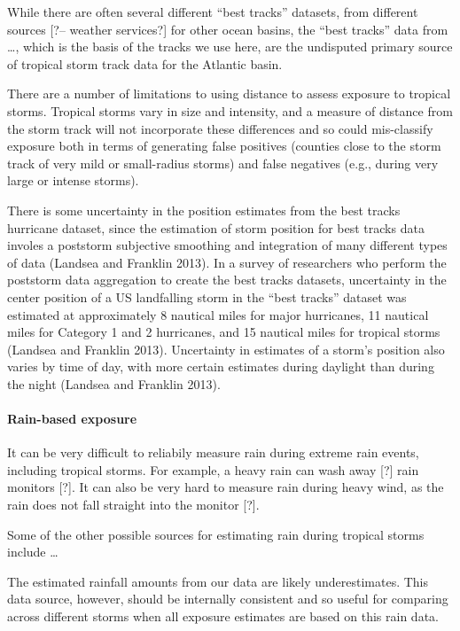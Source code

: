\documentclass[]{elsarticle} %
\begin{document}
While there are often several different ``best tracks'' datasets, from
different sources {[}?-- weather services?{]} for other ocean basins,
the ``best tracks'' data from \ldots{}, which is the basis of the tracks
we use here, are the undisputed primary source of tropical storm track
data for the Atlantic basin.

There are a number of limitations to using distance to assess exposure
to tropical storms. Tropical storms vary in size and intensity, and a
measure of distance from the storm track will not incorporate these
differences and so could mis-classify exposure both in terms of
generating false positives (counties close to the storm track of very
mild or small-radius storms) and false negatives (e.g., during very
large or intense storms).

There is some uncertainty in the position estimates from the best tracks
hurricane dataset, since the estimation of storm position for best
tracks data involes a poststorm subjective smoothing and integration of
many different types of data (Landsea and Franklin 2013). In a survey of
researchers who perform the poststorm data aggregation to create the
best tracks datasets, uncertainty in the center position of a US
landfalling storm in the ``best tracks'' dataset was estimated at
approximately 8 nautical miles for major hurricanes, 11 nautical miles
for Category 1 and 2 hurricanes, and 15 nautical miles for tropical
storms (Landsea and Franklin 2013). Uncertainty in estimates of a
storm's position also varies by time of day, with more certain estimates
during daylight than during the night (Landsea and Franklin 2013).

\paragraph{Rain-based exposure}\label{rain-based-exposure-1}

It can be very difficult to reliabily measure rain during extreme rain
events, including tropical storms. For example, a heavy rain can wash
away {[}?{]} rain monitors {[}?{]}. It can also be very hard to measure
rain during heavy wind, as the rain does not fall straight into the
monitor {[}?{]}.

Some of the other possible sources for estimating rain during tropical
storms include \ldots{}

The estimated rainfall amounts from our data are likely underestimates.
This data source, however, should be internally consistent and so useful
for comparing across different storms when all exposure estimates are
based on this rain data.
\end{document}
